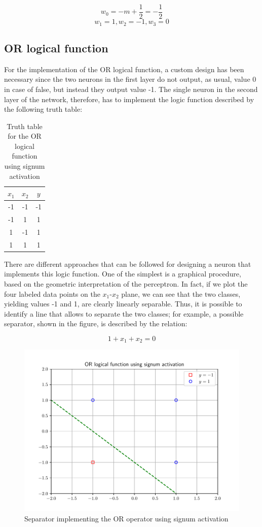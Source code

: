 \documentclass[letterpaper,headings=standardclasses]{scrartcl}
\begin{document}
$$ w_0 = -m + \frac{1}{2} = -\frac{1}{2} $$
$$ w_1 = 1, w_2 = -1, w_3 = 0 $$

\subsection{OR logical function}

For the implementation of the OR logical function, a custom design has been necessary since the two neurons in the first layer do not output, as usual, value 0 in case of false, but instead they output value -1. The single neuron in the second layer of the network, therefore, has to implement the logic function described by the following truth table:

\begin{table}[h]
\centering
\begin{tabular}{|c|c|c|}
\hline
$x_1$ & $x_2$ & $y$  \\ \hline
-1    & -1    & -1   \\ \hline
-1    & 1     & 1    \\ \hline
1     & -1    & 1    \\ \hline
1     & 1     & 1    \\ \hline
\end{tabular}
\caption{Truth table for the OR logical function using signum activation}
\end{table}

There are different approaches that can be followed for designing a neuron that implements this logic function. One of the simplest is a graphical procedure, based on the geometric interpretation of the perceptron. In fact, if we plot the four labeled data points on the $x_1$-$x_2$ plane, we can see that the two classes, yielding values -1 and 1, are clearly linearly separable. Thus, it is possible to identify a line that allows to separate the two classes; for example, a possible separator, shown in the figure, is described by the relation:

$$ 1 + x_1 + x_2 = 0 $$

\begin{figure}[h]
\centering
\includegraphics[width=.7\linewidth]{or_func.pdf}
\caption{Separator implementing the OR operator using signum activation}
\end{figure}
\end{document}
